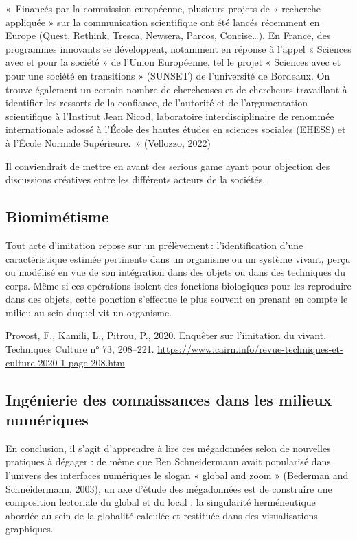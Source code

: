 \documentclass[
  letterpaper,
  DIV=11,
  numbers=noendperiod]{scrreprt}
\begin{document}
«~Financés par la commission européenne, plusieurs projets de «
recherche appliquée » sur la communication scientifique ont été lancés
récemment en Europe (Quest, Rethink, Tresca, Newsera, Parcos,
Concise\ldots). En France, des programmes innovants se développent,
notamment en réponse à l'appel « Sciences avec et pour la société » de
l'Union Européenne, tel le projet « Sciences avec et pour une société en
transitions » (SUNSET) de l'université de Bordeaux. On trouve également
un certain nombre de chercheuses et de chercheurs travaillant à
identifier les ressorts de la confiance, de l'autorité et de
l'argumentation scientifique à l'Institut Jean Nicod, laboratoire
interdisciplinaire de renommée internationale adossé à l'École des
hautes études en sciences sociales (EHESS) et à l'École Normale
Supérieure.~» (Vellozzo, 2022)

Il conviendrait de mettre en avant des serious game ayant pour objection
des discussions créatives entre les différents acteurs de la sociétés.

\hypertarget{biomimuxe9tisme}{%
\subsection{Biomimétisme}\label{biomimuxe9tisme}}

Tout acte d'imitation repose sur un prélèvement : l'identification d'une
caractéristique estimée pertinente dans un organisme ou un système
vivant, perçu ou modélisé en vue de son intégration dans des objets ou
dans des techniques du corps. Même si ces opérations isolent des
fonctions biologiques pour les reproduire dans des objets, cette
ponction s'effectue le plus souvent en prenant en compte le milieu au
sein duquel vit un organisme.

Provost, F., Kamili, L., Pitrou, P., 2020. Enquêter sur l'imitation du
vivant. Techniques Culture n° 73, 208--221.
\url{https://www.cairn.info/revue-techniques-et-culture-2020-1-page-208.htm}

\hypertarget{inguxe9nierie-des-connaissances-dans-les-milieux-numuxe9riques}{%
\subsection{Ingénierie des connaissances dans les milieux
numériques}\label{inguxe9nierie-des-connaissances-dans-les-milieux-numuxe9riques}}

En conclusion, il s'agit d'apprendre à lire ces mégadonnées selon de
nouvelles pratiques à dégager : de même que Ben Schneidermann avait
popularisé dans l'univers des interfaces numériques le slogan « global
and zoom » (Bederman and Schneidermann, 2003), un axe d'étude des
mégadonnées est de construire une composition lectoriale du global et du
local : la singularité herméneutique abordée au sein de la globalité
calculée et restituée dans des visualisations graphiques.
\end{document}
